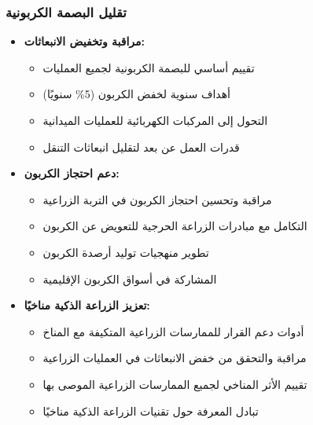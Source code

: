 \subsubsection{تقليل البصمة الكربونية}
\begin{itemize}
    \item \textbf{مراقبة وتخفيض الانبعاثات:}
    \begin{itemize}
        \item تقييم أساسي للبصمة الكربونية لجميع العمليات
        \item أهداف سنوية لخفض الكربون (5\% سنويًا)
        \item التحول إلى المركبات الكهربائية للعمليات الميدانية
        \item قدرات العمل عن بعد لتقليل انبعاثات التنقل
    \end{itemize}
    
    \item \textbf{دعم احتجاز الكربون:}
    \begin{itemize}
        \item مراقبة وتحسين احتجاز الكربون في التربة الزراعية
        \item التكامل مع مبادرات الزراعة الحرجية للتعويض عن الكربون
        \item تطوير منهجيات توليد أرصدة الكربون
        \item المشاركة في أسواق الكربون الإقليمية
    \end{itemize}
    
    \item \textbf{تعزيز الزراعة الذكية مناخيًا:}
    \begin{itemize}
        \item أدوات دعم القرار للممارسات الزراعية المتكيفة مع المناخ
        \item مراقبة والتحقق من خفض الانبعاثات في العمليات الزراعية
        \item تقييم الأثر المناخي لجميع الممارسات الزراعية الموصى بها
        \item تبادل المعرفة حول تقنيات الزراعة الذكية مناخيًا
    \end{itemize}
\end{itemize}


